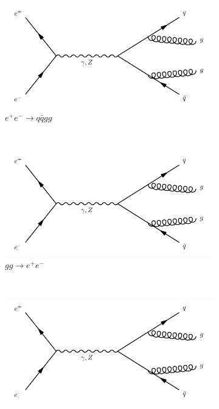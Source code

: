\begin{figure}[h]
  \centering
  \begin{subfigure}[b]{0.3\textwidth}
    \includegraphics[width=\textwidth]{../Diagrams/D1.pdf}
    \caption{$e^+e^- \rightarrow q\bar{q}gg$}
    \label{fey:1}
  \end{subfigure}%
  ~
  \begin{subfigure}[b]{0.3\textwidth}
    \includegraphics[width=\textwidth]{../Diagrams/D1.pdf}
    \caption{$gg\rightarrow e^+e^-$}
    \label{fey:2}
  \end{subfigure}%
  ~
  \begin{subfigure}[b]{0.3\textwidth}
    \includegraphics[width=\textwidth]{../Diagrams/D1.pdf}

\end{subfigure}
\end{figure}
